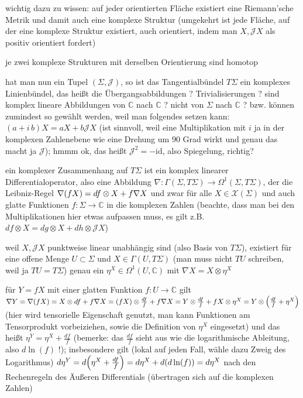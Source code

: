 \documentclass[../H_Analysis_main.tex]{subfiles}
\begin{document}
wichtig dazu zu wissen: auf jeder orientierten Fläche existiert eine Riemann'sche Metrik und damit auch eine komplexe Struktur (umgekehrt ist jede Fläche, auf der eine komplexe Struktur existiert, auch orientiert, indem man $X, \mathcal{J}X$ als positiv orientiert fordert)

je zwei komplexe Strukturen mit derselben Orientierung sind homotop 


hat man nun ein Tupel $(\Sigma, \mathcal{J})$, so ist das Tangentialbündel $T\Sigma$ ein komplexes Linienbündel, das heißt die Übergangsabbildungen ? Trivialisierungen ? sind komplex lineare Abbildungen von $\mathbb{C}$ nach $\mathbb{C}$ ? nicht von $\Sigma$ nach $\mathbb{C}$ ? bzw. können zumindest so gewählt werden, weil man folgendes setzen kann: $(a + i \, b) X = a X + b \mathcal{J} X$ (ist sinnvoll, weil eine Multiplikation mit $i$ ja in der komplexen Zahlenebene wie eine Drehung um 90 Grad wirkt und genau das macht ja $\mathcal{J}$); hmmm ok, das heißt $\mathcal{J}^2 = - \text{id}$, also Spiegelung, richtig?


ein komplexer Zusammenhang auf $T\Sigma$ ist ein komplex linearer Differentialoperator, also eine Abbildung $\nabla: \Gamma(\Sigma, T\Sigma) \rightarrow \Omega^1(\Sigma, T\Sigma)$, der die Leibniz-Regel $\nabla\qty(f X) = df \otimes X + f \nabla X$ und zwar für alle $X \in \mathcal{X}(\Sigma)$ und auch glatte Funktionen $f: \Sigma \rightarrow \mathbb{C}$ in die komplexen Zahlen (beachte, dass man bei den Multiplikationen hier etwas aufpassen muss, es gilt z.B. $df \otimes X = dg \otimes X + dh \otimes \mathcal{J} X$)


weil $X, \mathcal{J}X$ punktweise linear unabhängig sind (also Basis von $T\Sigma$), existiert für eine offene Menge $U \subset \Sigma$ und $X \in \Gamma(U, T\Sigma)$ (man muss nicht $TU$ schreiben, weil ja $TU = T\Sigma$) genau ein $\eta^X \in \Omega^1(U, \mathbb{C})$ mit $\nabla X = X \otimes \eta^X$

für  $Y = f X$ mit einer glatten Funktion $f: U \rightarrow \mathbb{C}$ gilt $\nabla Y = \nabla(f X) = X \otimes df + f \nabla X = \qty(f X) \otimes \frac{df}{f} + f \nabla X = Y \otimes \frac{df}{f} + f X \otimes \eta^X = Y \otimes \qty(\frac{df}{f} + \eta^X)$ (hier wird tensorielle Eigenschaft genutzt, man kann Funktionen am Tensorprodukt vorbeiziehen, sowie die Definition von $\eta^X$ eingesetzt) und das heißt $\eta^Y = \eta^X + \frac{df}{f}$ (bemerke: das $\frac{df}{f}$ sieht aus wie die logarithmische Ableitung, also $d\ln(f)$ !); insbesondere gilt (lokal auf jeden Fall, wähle dazu Zweig des Logarithmus) $d\eta^Y = d\qty(\eta^X + \frac{df}{f}) = d\eta^X + d\qty(d\ln(f)) = d\eta^X$ nach den Rechenregeln des Äußeren Differentials (übertragen sich auf die komplexen Zahlen)
\end{document}
